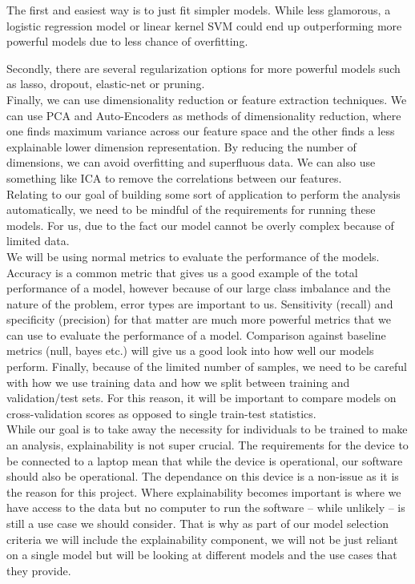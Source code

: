 \documentclass[11pt,a4paper]{article}
\begin{document}
The first and easiest way is to just fit simpler models. While less glamorous, a logistic regression model or linear kernel SVM could end up outperforming more powerful models due to less chance of overfitting.

 Secondly, there are several regularization options for more powerful models such as lasso, dropout, elastic-net or pruning.  \\

Finally, we can use dimensionality reduction or feature extraction techniques. We can use PCA and Auto-Encoders as methods of dimensionality reduction, where one finds maximum variance across our feature space and the other finds a less explainable lower dimension representation. By reducing the number of dimensions, we can avoid overfitting and superfluous data. We can also use something like ICA to remove the correlations between our features. \\

Relating to our goal of building some sort of application to perform the analysis automatically, we need to be mindful of the requirements for running these models. For us, due to the fact our model cannot be overly complex because of limited data. \\

We will be using normal metrics to evaluate the performance of the models. Accuracy is a common metric that gives us a good example of the total performance of a model, however because of our large class imbalance and the nature of the problem, error types are important to us. Sensitivity (recall) and specificity (precision) for that matter are much more powerful metrics that we can use to evaluate the performance of a model. Comparison against baseline metrics (null, bayes etc.) will give us a good look into how well our models perform. Finally, because of the limited number of samples, we need to be careful with how we use training data and how we split between training and validation/test sets. For this reason, it will be important to compare models on cross-validation scores as opposed to single train-test statistics. \\

While our goal is to take away the necessity for individuals to be trained to make an analysis, explainability is not super crucial. The requirements for the device to be connected to a laptop mean that while the device is operational, our software should also be operational. The dependance on this device is a non-issue as it is the reason for this project. Where explainability becomes important is where we have access to the data but no computer to run the software – while unlikely – is still a use case we should consider. That is why as part of our model selection criteria we will include the explainability component, we will not be just reliant on a single model but will be looking at different models and the use cases that they provide. 
\end{document}
